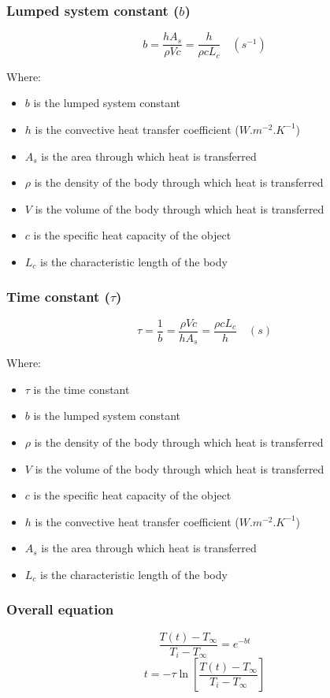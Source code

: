 \documentclass[11pt]{article}
\begin{document}
 \newpage
\subsubsection{Lumped system constant (\(b\))}
\label{sec:org5e791e7}
\[b = \frac{h A_s}{\rho V c} = \frac{h}{\rho c L_c} \quad (\unit{s^{-1}})\]

Where:
\begin{itemize}
\item \(b\) is the lumped system constant
\item \(h\) is the convective heat transfer coefficient (\(\unit{W.m^{-2}.K^{-1}}\))
\item \(A_s\) is the area through which heat is transferred
\item \(\rho\) is the density of the body through which heat is transferred
\item \(V\) is the volume of the body through which heat is transferred
\item \(c\) is the specific heat capacity of the object
\item \(L_c\) is the characteristic length of the body
\end{itemize}
\subsubsection{Time constant (\(\tau\))}
\label{sec:org19936d7}
\[\tau = \frac{1}{b} = \frac{\rho V c}{h A_s} = \frac{\rho c L_c}{h} \quad (\unit{s})\]

Where:
\begin{itemize}
\item \(\tau\) is the time constant
\item \(b\) is the lumped system constant
\item \(\rho\) is the density of the body through which heat is transferred
\item \(V\) is the volume of the body through which heat is transferred
\item \(c\) is the specific heat capacity of the object
\item \(h\) is the convective heat transfer coefficient (\(\unit{W.m^{-2}.K^{-1}}\))
\item \(A_s\) is the area through which heat is transferred
\item \(L_c\) is the characteristic length of the body
\end{itemize}
\subsubsection{Overall equation}
\label{sec:org8476ff5}
\[\frac{T(t) - T_{\infty}}{T_i - T_{\infty}} = e^{-bt}\]
\[t = - \tau \ln \left[\frac{T(t) - T_{\infty}}{T_i - T_{\infty}} \right]\]
\end{document}
